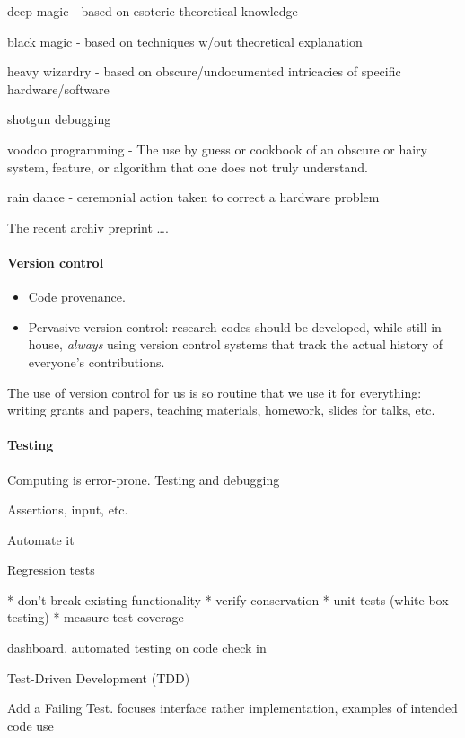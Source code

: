 \documentclass[ChapterTOCs,krantz2]{krantz} %
\begin{document}
  deep magic - based on esoteric theoretical knowledge
  
  black magic - based on techniques w/out theoretical explanation
  
  heavy wizardry - based on obscure/undocumented intricacies of specific 
                  hardware/software
  
  shotgun debugging
  
  voodoo programming -  The use by guess or cookbook of an
  obscure or hairy system, feature, or algorithm that one does not truly
  understand.

  rain dance - ceremonial action taken to correct a hardware problem

The recent archiv preprint \ldots \cite{2012arXiv1210.0530A}.
\paragraph{ {\bf Version control}}

\begin{itemize}

\item Code provenance.

\item Pervasive version control: research codes should be developed, while
still in-house, \emph{always} using version control systems that track
the actual history of everyone's contributions.

\end{itemize}

The use of version control for us is so routine that we use it for everything:
writing grants and papers, teaching materials, homework, slides for talks, etc.

\paragraph{ {\bf Testing}}
Computing is error-prone.
Testing and debugging

Assertions, input, etc.

Automate it

Regression tests

* don't break existing functionality
* verify conservation
* unit tests (white box testing)
* measure test coverage

dashboard. automated testing on code check in

Test-Driven Development (TDD)

Add a Failing Test. focuses interface rather implementation, examples of intended code use 
\end{document}
